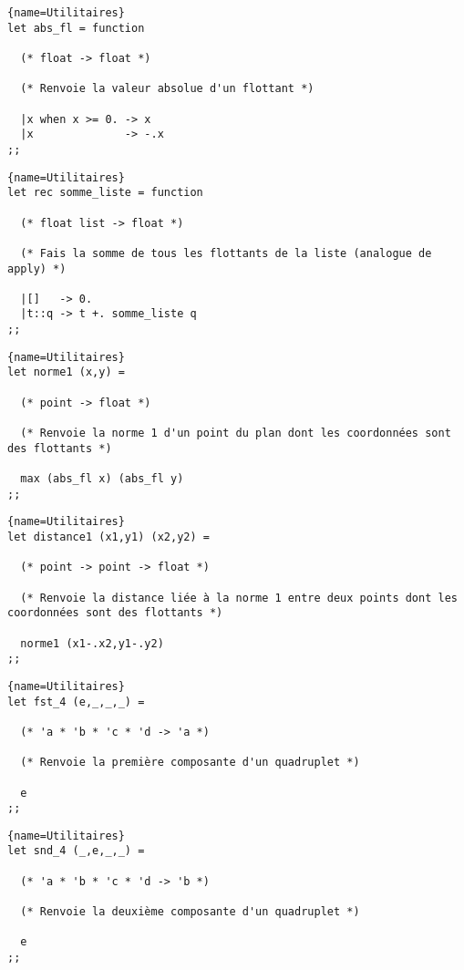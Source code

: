\documentclass[10pt,twoside,a4paper]{article}
\begin{document}
\begin{lstlisting}{name=Utilitaires}
let abs_fl = function

  (* float -> float *)

  (* Renvoie la valeur absolue d'un flottant *)

  |x when x >= 0. -> x
  |x              -> -.x
;;
\end{lstlisting}
\pagebreak
\begin{lstlisting}{name=Utilitaires}
let rec somme_liste = function

  (* float list -> float *)

  (* Fais la somme de tous les flottants de la liste (analogue de apply) *)

  |[]   -> 0.
  |t::q -> t +. somme_liste q
;;
\end{lstlisting}

\begin{lstlisting}{name=Utilitaires}
let norme1 (x,y) =

  (* point -> float *)

  (* Renvoie la norme 1 d'un point du plan dont les coordonnées sont des flottants *)
  
  max (abs_fl x) (abs_fl y)
;;
\end{lstlisting}

\begin{lstlisting}{name=Utilitaires}
let distance1 (x1,y1) (x2,y2) =

  (* point -> point -> float *)

  (* Renvoie la distance liée à la norme 1 entre deux points dont les coordonnées sont des flottants *)
  
  norme1 (x1-.x2,y1-.y2)
;;
\end{lstlisting}

\begin{lstlisting}{name=Utilitaires}
let fst_4 (e,_,_,_) =

  (* 'a * 'b * 'c * 'd -> 'a *)

  (* Renvoie la première composante d'un quadruplet *)
  
  e
;;
\end{lstlisting}

\begin{lstlisting}{name=Utilitaires}
let snd_4 (_,e,_,_) =
  
  (* 'a * 'b * 'c * 'd -> 'b *)

  (* Renvoie la deuxième composante d'un quadruplet *)
  
  e
;;
\end{lstlisting}
\end{document}
